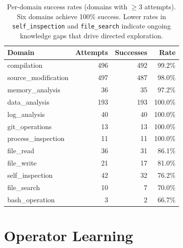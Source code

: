 \documentclass[12pt,a4paper]{report}
\begin{document}
\begin{table}[H]
\centering
\small
\begin{tabular}{lrrr}
\toprule
\textbf{Domain} & \textbf{Attempts} & \textbf{Successes} & \textbf{Rate} \\
\midrule
compilation & 496 & 492 & 99.2\% \\
source\_modification & 497 & 487 & 98.0\% \\
memory\_analysis & 36 & 35 & 97.2\% \\
data\_analysis & 193 & 193 & 100.0\% \\
log\_analysis & 40 & 40 & 100.0\% \\
git\_operations & 13 & 13 & 100.0\% \\
process\_inspection & 11 & 11 & 100.0\% \\
file\_read & 36 & 31 & 86.1\% \\
file\_write & 21 & 17 & 81.0\% \\
self\_inspection & 42 & 32 & 76.2\% \\
file\_search & 10 & 7 & 70.0\% \\
bash\_operation & 3 & 2 & 66.7\% \\
\bottomrule
\end{tabular}
\caption{Per-domain success rates (domains with $\geq$3 attempts). Six domains achieve 100\% success. Lower rates in \texttt{self\_inspection} and \texttt{file\_search} indicate ongoing knowledge gaps that drive directed exploration.}
\label{tab:domain-success}
\end{table}

\section{Operator Learning}
\end{document}
